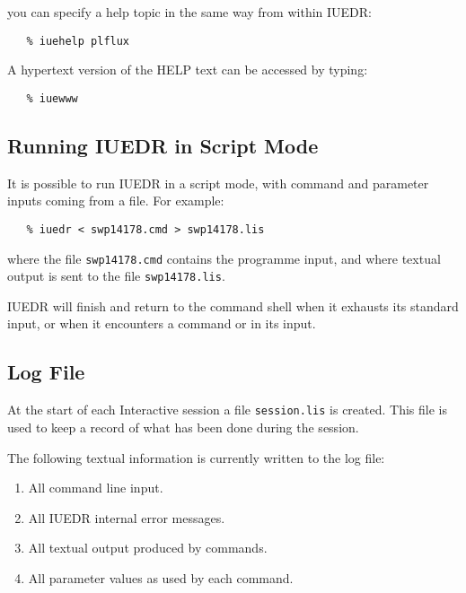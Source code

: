 you can specify a help topic in the same way from within IUEDR:

\begin{verbatim}
   % iuehelp plflux
\end{verbatim}

A hypertext version of the HELP text can be accessed by typing:

\begin{verbatim}
   % iuewww
\end{verbatim}


\subsection{\label{subse:sc_and_ba}Running IUEDR in Script Mode}

It is possible to run IUEDR in a script mode, with command and
parameter inputs coming from a file.  For example:

\begin{verbatim}
   % iuedr < swp14178.cmd > swp14178.lis
\end{verbatim}

where the file \verb+swp14178.cmd+ contains the programme input, and where
textual output is sent to the file \verb+swp14178.lis+\@.

IUEDR will finish and return to the command shell when it exhausts its standard
input, or when it encounters a command 
 or 
 in its input.


\subsection{Log File}

At the start of each Interactive session a file \verb+session.lis+ is created.
This file is used to keep a record of what has been done during the session.

The following textual information is currently written to the log file:

\begin{enumerate}

\item All command line input.

\item All IUEDR internal error messages.

\item All textual output produced by commands.

\item All parameter values as used by each command.

\end{enumerate}

